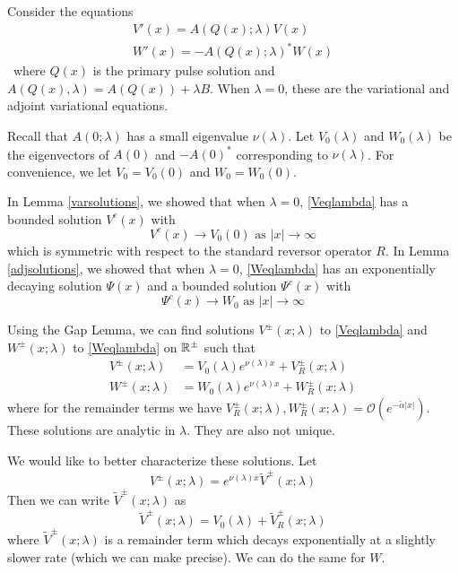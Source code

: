 \documentclass[thesis.tex]{subfiles}
\begin{document}
Consider the equations
\begin{align}
V'(x) = A(Q(x); \lambda) V(x) \label{Veqlambda} \\
W'(x) = -A(Q(x); \lambda)^* W(x) \label{Weqlambda}
\end{align}\
where $Q(x)$ is the primary pulse solution and $A(Q(x), \lambda) = A(Q(x)) + \lambda B$. When $\lambda = 0$, these are the variational and adjoint variational equations.

Recall that $A(0; \lambda)$ has a small eigenvalue $\nu(\lambda)$. Let $V_0(\lambda)$ and $W_0(\lambda)$ be the eigenvectors of $A(0)$ and $-A(0)^*$ corresponding to $\nu(\lambda)$. For convenience, we let $V_0 = V_0(0)$ and $W_0 = W_0(0)$.

In Lemma \ref{varsolutions}, we showed that when $\lambda = 0$, \eqref{Veqlambda} has a bounded solution $V^c(x)$ with
\[
V^c(x) \rightarrow V_0(0) \text{ as }|x| \rightarrow \infty
\]
which is symmetric with respect to the standard reversor operator $R$. In Lemma \ref{adjsolutions}, we showed that when $\lambda = 0$, \eqref{Weqlambda} has an exponentially decaying solution $\Psi(x)$ and a bounded solution $\Psi^c(x)$ with 
\[
\Psi^c(x) \rightarrow W_0 \text{ as }|x| \rightarrow \infty
\]

Using the Gap Lemma, we can find solutions $V^\pm(x; \lambda)$ to \eqref{Veqlambda} and $W^\pm(x; \lambda)$ to \eqref{Weqlambda} on ${\mathbb R}^\pm$ such that
\begin{align*}
V^\pm(x; \lambda) &= V_0(\lambda)e^{\nu(\lambda)x} + V_R^\pm(x; \lambda) \\
W^\pm(x; \lambda) &= W_0(\lambda)e^{\nu(\lambda)x} + W_R^\pm(x; \lambda)
\end{align*}
where for the remainder terms we have $V_R^\pm(x; \lambda), W_R^\pm(x; \lambda) = \mathcal{O}(e^{-\tilde{\alpha}|x|})$. These solutions are analytic in $\lambda$. They are also not unique.

We would like to better characterize these solutions. Let
\[
V^\pm(x; \lambda) = e^{\nu(\lambda)x}\tilde{V}^\pm(x; \lambda)
\]
Then we can write $\tilde{V}^\pm(x; \lambda)$ as
\[
\tilde{V}^\pm(x; \lambda) = V_0(\lambda) + \tilde{V}_R^\pm(x; \lambda)
\]
where $\tilde{V}^\pm(x; \lambda)$ is a remainder term which decays exponentially at a slightly slower rate (which we can make precise). We can do the same for $W$.
\end{document}
